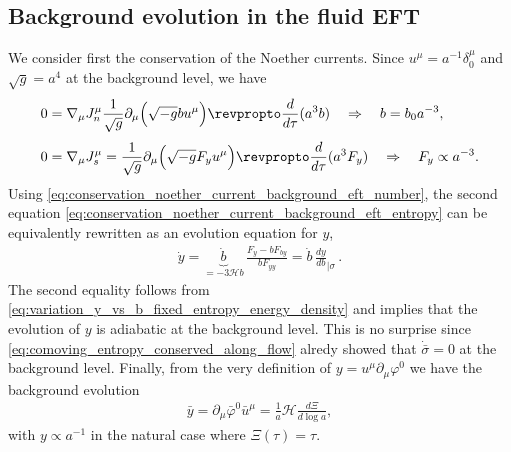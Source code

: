 \subsection{Background evolution in the fluid EFT}\label{sec:bkg_evolution_fluid_EFT}
%
We consider first the conservation of the Noether currents.
Since $u^\mu=a^{-1}\delta^\mu_0$ and $\sqrt{g}=a^{4}$ at the background level, we have
\begin{subequations}\label{eq:conservation_noether_current_background_eft}
\begin{align}
    &0=\nabla_\mu J_n^\mu \frac{1}{\sqrt{g}} \partial_\mu\Big(\sqrt{-g} b u^\mu\Big) \revpropto \frac{d}{d\tau}(a^3 b)\quad \Rightarrow \quad b = b_0 a^{-3},\label{eq:conservation_noether_current_background_eft_number}\\[3pt]
    &0=\nabla_\mu J_s^\mu =\frac{1}{\sqrt{g}} \partial_\mu\Big(\sqrt{-g} F_y u^\mu\Big) \revpropto \frac{d}{d\tau}(a^3 F_y)\quad \Rightarrow \quad F_y\propto a^{-3}. \label{eq:conservation_noether_current_background_eft_entropy}
\end{align}
\end{subequations}
Using \eqref{eq:conservation_noether_current_background_eft_number}, the second equation \eqref {eq:conservation_noether_current_background_eft_entropy} can be equivalently rewritten as an evolution equation for $y$,
\begin{align}\label{eq:eolvution_y_background}
    \dot{y}=\underbrace{\dot{b}}_{=-3\mathcal{H}b}\,\frac{F_y-bF_{by}}{bF_{yy}} =\dot{b}\, \frac{dy}{db}_{|\sigma}\,.
\end{align}
The second equality follows from \eqref{eq:variation_y_vs_b_fixed_entropy_energy_density} and implies that the evolution of $y$ is adiabatic at the background level.
This is no surprise since \eqref{eq:comoving_entropy_conserved_along_flow} alredy showed that $\dot{\bar{\sigma}}=0$ at the background level.
Finally, from the very definition of $y=u^\mu\partial_\mu\varphi^0$ we have the background evolution
\begin{align}\label{eq:evolution_y_background_from_definition}
    \bar{y}=\partial_\mu\bar{\varphi}^0 \bar{u}^\mu = \frac{1}{a}\mathcal{H}\frac{d\Xi}{d\log\!a},
\end{align}
with $y\propto a^{-1}$ in the natural case where $\Xi(\tau)=\tau$.


